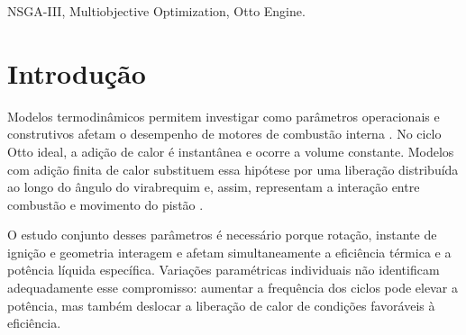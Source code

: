 \documentclass[a4paper,11pt]{article}
\begin{document}
\vspace{2mm}

\begin{abstract}
This study applies the Non-dominated Sorting Genetic Algorithm III (NSGA-III)
to the simultaneous optimization of thermal efficiency and net specific power
in a finite-time heat-addition Otto engine model. The Non-dominated Sorting
Genetic Algorithm II (NSGA-II), an adapted Multiobjective Particle Swarm
Optimization (MOPSO), and the Multiobjective Evolutionary Algorithm Based on
Decomposition (MOEA/D) are used as benchmarks. Engine speed, ignition timing,
compression ratio, and
connecting-rod-to-crank ratio are optimized. Across 21 runs per method, with
4,848 evaluations each, NSGA-III achieved a mean hypervolume of fronts limited
to 48 solutions ($HV_{48}$) of 0.844977, 0.116\% below NSGA-II. No
statistically significant difference was detected between NSGA-III and the
adapted MOPSO at the 5\% level, whereas NSGA-III achieved significantly higher
$HV_{48}$ than MOEA/D. The methods located similar thermodynamic compromises,
confirming the efficiency--power conflict. NSGA-III was competitive, although
NSGA-II achieved higher $HV_{48}$ in this biobjective problem.
\end{abstract}

\smallskip
\begin{keywords}
NSGA-III, Multiobjective Optimization, Otto Engine.

\smallskip
{}
\end{keywords}


\newpage

\section{Introdução}

Modelos termodinâmicos permitem investigar como parâmetros operacionais e
construtivos afetam o desempenho de motores de combustão interna
\citep{heywood2018}. No ciclo Otto ideal, a adição de calor é instantânea e
ocorre a volume constante. Modelos com adição finita de calor substituem essa
hipótese por uma liberação distribuída ao longo do ângulo do virabrequim e,
assim, representam a interação entre combustão e movimento do pistão
\citep{naaktgeboren2017}.

O estudo conjunto desses parâmetros é necessário porque rotação, instante de
ignição e geometria interagem e afetam simultaneamente a eficiência térmica e a
potência líquida específica. Variações paramétricas individuais não identificam
adequadamente esse compromisso: aumentar a frequência dos ciclos pode elevar a
potência, mas também deslocar a liberação de calor de condições favoráveis à
eficiência.
\end{document}

